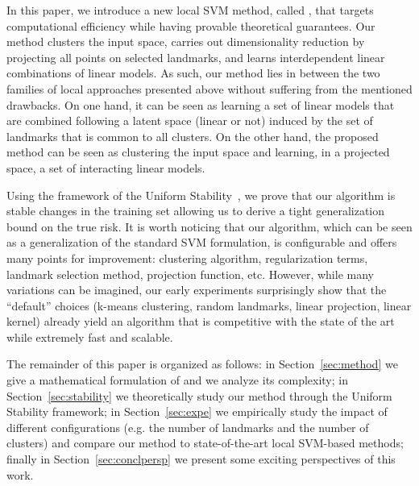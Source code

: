 In this paper, we introduce a new local SVM method, called \landSVM, that targets computational efficiency while having provable theoretical guarantees.
Our method clusters the input space, carries out dimensionality reduction by projecting all points on selected landmarks, and learns interdependent linear combinations of linear models.
As such, our method lies in between the two families of local approaches presented above without suffering from the mentioned drawbacks.
On one hand, it can be seen as learning a set of linear models that are combined following a latent space (linear or not) induced by the set of landmarks that is common to all clusters.
On the other hand, the proposed method can be seen as clustering the input space and learning, in a projected space, a set of interacting linear models.

Using the framework of the Uniform Stability~\cite{bousquet2002stability}, we prove that our algorithm is stable \wrt changes in the training set allowing us to derive a tight generalization bound on the true risk.
It is worth noticing that our algorithm, which can be seen as a generalization of the standard SVM formulation, is configurable and offers many points for improvement: clustering algorithm, regularization terms, landmark selection method, projection function, etc.
However, while many variations can be imagined, our early experiments surprisingly show that the ``default'' choices (k-means clustering, random landmarks, linear projection, linear kernel) already yield an algorithm that is competitive with the state of the art while extremely fast and scalable.

The remainder of this paper is organized as follows: in Section~\ref{sec:method} we give a mathematical formulation of \landSVM and we analyze its complexity; in Section~\ref{sec:stability} we theoretically study our method through the Uniform Stability framework; in Section~\ref{sec:expe} we 
empirically study the impact of different configurations (e.g. the number of landmarks and the number of clusters) and compare our method to state-of-the-art local SVM-based methods; finally in Section~\ref{sec:conclpersp} we present some exciting perspectives of this work.
